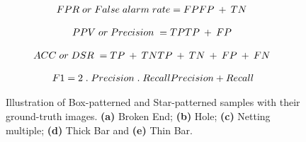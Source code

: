 \documentclass[3p,,preprint,review,12pt]{elsarticle}
\makeatletter
\def\fixFloatSize#1{}%
\makeatother
\begin{document}
\let\saveeqnno\theequation
\let\savefrac\frac
\def\dispfrac{\displaystyle\savefrac}
\begin{eqnarray}
\let\frac\dispfrac
\gdef\theequation{18}
\let\theHequation\theequation
\label{dfg-fd2e448a99e0}
\begin{array}{@{}l}FPR\;or\;False\;alarm\;rate=\frac{FP}{FP\:+\:TN}\;\end{array}
\end{eqnarray}
\global\let\theequation\saveeqnno
\addtocounter{equation}{-1}\ignorespaces 

\let\saveeqnno\theequation
\let\savefrac\frac
\def\dispfrac{\displaystyle\savefrac}
\begin{eqnarray}
\let\frac\dispfrac
\gdef\theequation{19}
\let\theHequation\theequation
\label{dfg-869ba968230c}
\begin{array}{@{}l}PPV\;or\;Precision\;=\frac{TP}{TP\:+\:FP}\;\end{array}
\end{eqnarray}
\global\let\theequation\saveeqnno
\addtocounter{equation}{-1}\ignorespaces 

\let\saveeqnno\theequation
\let\savefrac\frac
\def\dispfrac{\displaystyle\savefrac}
\begin{eqnarray}
\let\frac\dispfrac
\gdef\theequation{20}
\let\theHequation\theequation
\label{dfg-1ccf68c8052b}
\begin{array}{@{}l}ACC\;or\;DSR\;=\frac{TP\:+\:TN}{TP\:+\:TN\:+\:FP\:+\:FN}\;\end{array}
\end{eqnarray}
\global\let\theequation\saveeqnno
\addtocounter{equation}{-1}\ignorespaces 

\let\saveeqnno\theequation
\let\savefrac\frac
\def\dispfrac{\displaystyle\savefrac}
\begin{eqnarray}
\let\frac\dispfrac
\gdef\theequation{21}
\let\theHequation\theequation
\label{disp-formula-group-ad79c89e70a04ac5b479aa8338d65e7c}
\begin{array}{@{}l}F1=2\;.\;\frac{Precision\;.\;Recall}{Precision+Recall}\end{array}
\end{eqnarray}
\global\let\theequation\saveeqnno
\addtocounter{equation}{-1}\ignorespaces 

\bgroup
\fixFloatSize{Figures/Figure8.png}
\begin{figure*}[!htbp]
\centering \makeatletter{}
\makeatother 
\caption{{Illustration of Box-patterned and Star-patterned samples with their ground-truth images. \textbf{(a)} Broken End; \textbf{(b)} Hole; \textbf{(c)} Netting multiple; \textbf{(d)} Thick Bar and \textbf{(e)} Thin Bar.}}
\label{figure-fb7cbfe9a69843f88ac2097063467826}
\end{figure*}
\egroup
    
\end{document}
